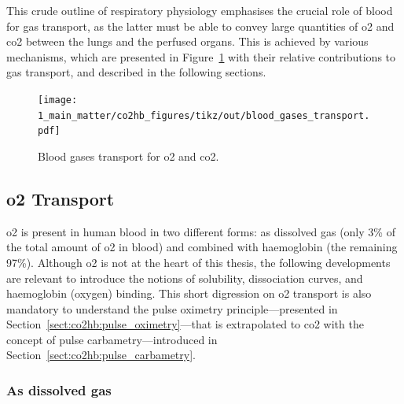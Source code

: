 This crude outline of respiratory physiology emphasises the crucial role of blood for gas transport, as the latter must be able to convey large quantities of \gls{o2} and \gls{co2} between the lungs and the perfused organs. This is achieved by various mechanisms, which are presented in Figure~\ref{fig:co2hb:blood_gases_transport} with their relative contributions to gas transport, and described in the following sections.


\begin{figure}
	\centering
	\texttt{[image: 1\_main\_matter/co2hb\_figures/tikz/out/blood\_gases\_transport.pdf]}
	\caption{Blood gases transport for \gls{o2} and \gls{co2}.}
	\label{fig:co2hb:blood_gases_transport}
\end{figure}

\subsection{\texorpdfstring{\gls{o2}}{O2} Transport}\label{subsect:co2hb:o2_transport}

\gls{o2} is present in human blood in two different forms: as dissolved gas (only 3\% of the total amount of \gls{o2} in blood) and combined with haemoglobin (the remaining 97\%). Although \gls{o2} is not at the heart of this thesis, the following developments are relevant to introduce the notions of solubility, dissociation curves, and haemoglobin (oxygen) binding. This short digression on \gls{o2} transport is also mandatory to understand the pulse oximetry principle---presented in Section~\ref{sect:co2hb:pulse_oximetry}---that is extrapolated to \gls{co2} with the concept of pulse carbametry---introduced in Section~\ref{sect:co2hb:pulse_carbametry}.

\subsubsection{As dissolved gas}

